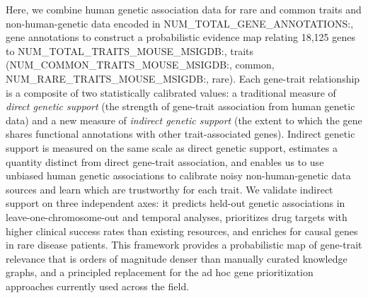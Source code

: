 Here, we combine human genetic association data for rare and common traits and non-human-genetic data encoded in {{NUM_TOTAL_GENE_ANNOTATIONS:,}} gene annotations to construct a probabilistic evidence map relating 18,125 genes to {{NUM_TOTAL_TRAITS_MOUSE_MSIGDB:,}} traits ({{NUM_COMMON_TRAITS_MOUSE_MSIGDB:,}} common, {{NUM_RARE_TRAITS_MOUSE_MSIGDB:,}} rare). Each gene-trait relationship is a composite of two statistically calibrated values: a traditional measure of \textit{direct genetic support} (the strength of gene-trait association from human genetic data) and a new measure of \textit{indirect genetic support} (the extent to which the gene shares functional annotations with other trait-associated genes). Indirect genetic support is measured on the same scale as direct genetic support, estimates a quantity distinct from direct gene-trait association, and enables us to use unbiased human genetic associations to calibrate noisy non-human-genetic data sources and learn which are trustworthy for each trait. We validate indirect support on three independent axes: it predicts held-out genetic associations in leave-one-chromosome-out and temporal analyses, prioritizes drug targets with higher clinical success rates than existing resources, and enriches for causal genes in rare disease patients. This framework provides a probabilistic map of gene-trait relevance that is orders of magnitude denser than manually curated knowledge graphs, and a principled replacement for the ad hoc gene prioritization approaches currently used across the field.
